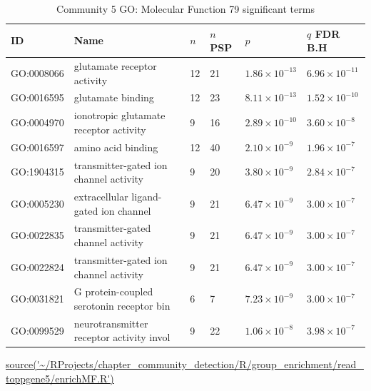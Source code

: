 \begin{table}[ht]
\centering
\setlength{\extrarowheight}{2pt}
\begin{adjustbox}{width=\textwidth}
\begin{tabular}{llllll}
  \toprule
ID & Name & $n$ & $n$ PSP & $p$ & $q$ FDR B.H \\ 
  \midrule
GO:0008066 & glutamate receptor activity & 12 & 21 & $1.86 \times 10^{-13}$ & $6.96 \times 10^{-11}$ \\ 
  GO:0016595 & glutamate binding & 12 & 23 & $8.11 \times 10^{-13}$ & $1.52 \times 10^{-10}$ \\ 
  GO:0004970 & ionotropic glutamate receptor activity & 9 & 16 & $2.89 \times 10^{-10}$ & $3.60 \times 10^{-8}$ \\ 
  GO:0016597 & amino acid binding & 12 & 40 & $2.10 \times 10^{-9}$ & $1.96 \times 10^{-7}$ \\ 
  GO:1904315 & transmitter-gated ion channel activity  & 9 & 20 & $3.80 \times 10^{-9}$ & $2.84 \times 10^{-7}$ \\ 
  GO:0005230 & extracellular ligand-gated ion channel  & 9 & 21 & $6.47 \times 10^{-9}$ & $3.00 \times 10^{-7}$ \\ 
  GO:0022835 & transmitter-gated channel activity & 9 & 21 & $6.47 \times 10^{-9}$ & $3.00 \times 10^{-7}$ \\ 
  GO:0022824 & transmitter-gated ion channel activity & 9 & 21 & $6.47 \times 10^{-9}$ & $3.00 \times 10^{-7}$ \\ 
  GO:0031821 & G protein-coupled serotonin receptor bin & 6 & 7 & $7.23 \times 10^{-9}$ & $3.00 \times 10^{-7}$ \\ 
  GO:0099529 & neurotransmitter receptor activity invol & 9 & 22 & $1.06 \times 10^{-8}$ & $3.98 \times 10^{-7}$ \\ 
   \bottomrule
\end{tabular}
\end{adjustbox}
\caption[Community 5 Gene Ontology Analysis Molecular Function]{Community 5 GO: Molecular Function 79 significant terms} 
\tiny\url{source('~/RProjects/chapter_community_detection/R/group_enrichment/read_toppgene5/enrichMF.R')}
\label{tab:Group 5 GO: Molecular Function 79 significant terms}
\end{table}

